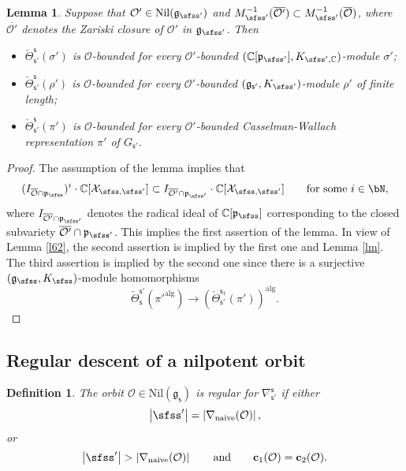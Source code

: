 \documentclass[12pt,a4paper]{amsart}
\def\abs#1{\left|{#1}\right|}
\newcommand{\CO}{{\mathcal {O}}}
\newcommand{\CX}{{\mathcal {X}}}
\newcommand{\g}{\mathfrak g}
\newcommand{\p}{\mathfrak p}
\def\DD{\nabla}
\numberwithin{equation}{section}
\newtheorem{lem}[thm]{Lemma}
\newtheorem{defn}[thm]{Definition}
\theoremstyle{remark}
\begin{document}
\begin{lem}\label{comobound}
Suppose that $\CO'\in \mathrm{Nil}(\g_{\sfss'})$ and  $M_{\sfss'}^{-1}(\overline{\CO'})\subset M_{\sfss'}^{-1}(\overline{\CO})$, where  $\overline{\CO'}$ denotes the Zariski closure of $\CO'$ in $\g_{\sfss'}$.  Then
\begin{itemize}
\item
$\check \Theta_{\mathsf s'}^{\mathsf s}(\sigma')$ is $\CO$-bounded for every $\CO'$-bounded $(\C[\p_{\sfss'}], K_{\sfss', \C})$-module $\sigma'$;
\item
 $\check \Theta_{\mathsf s'}^{\mathsf s}(\rho')$ is $\CO$-bounded for every $\CO'$-bounded $(\g_{\mathsf s'}, K_{\sfss'})$-module $\rho'$ of finite length;
 \item $\check \Theta_{\mathsf s'}^{\mathsf s}(\pi')$ is $\CO$-bounded for every $\CO'$-bounded Casselman-Wallach representation $\pi'$ of $G_{\mathsf s'}$.
 \end{itemize}
\end{lem}
\begin{proof} The assumption of the lemma implies  that
\[
 ( I_{\overline{\CO}\cap \p_\sfss})^i\cdot \C[\CX_{\sfss, \sfss'}] \subset I_{\overline{\CO'}\cap \p_{\sfss'}}\cdot  \C[\CX_{\sfss, \sfss'}]\qquad \textrm{for some } i\in \bN,
\]
where $I_{\overline{\CO'}\cap \p_{\sfss'}}$ denotes  the radical ideal of $\C[\p_\sfss]$ corresponding to the closed subvariety $\overline{\CO'}\cap \p_{\sfss'}$.
This implies the first assertion of the lemma. In view of Lemma \ref{l62}, the second assertion is implied by the first one and Lemma \ref{lm}. The third assertion is implied by the second one since there is a surjective
$(\g_{\sfss}, K_{\sfss})$-module homomorphisms
\[
\check \Theta_{\mathsf s}^{\mathsf s'}(\pi'^{\mathrm{alg}})\rightarrow \left (\check \Theta_{\mathsf s'}^{\mathsf s_1}(\pi')\right )^{\mathrm{alg}}.
 \]

\end{proof}


\subsection{Regular descent of a nilpotent orbit}\label{regud}

\begin{defn}
The orbit $\CO\in \mathrm{Nil}(\g_\mathsf s)$ is regular for $\DD_{\mathsf s'}^{\mathsf s}$ if
either
\[
\abs{\sfss'}=\abs{\DD_\mathrm{naive}(\CO)},
\]
 or
 \[
 \abs{\sfss'}>\abs{\DD_\mathrm{naive}(\CO)}\qquad\textrm{and}\qquad \mathbf c_1(\CO)=\mathbf c_2(\CO).
\]

\end{defn}
\end{document}
